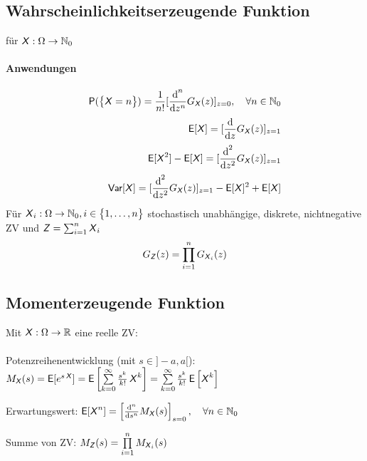 \documentclass[german,color,6pt]{latex4ei/latex4ei_sheet}
\begin{document}
\begin{sectionbox}
	\subsection{Wahrscheinlichkeitserzeugende Funktion} 
	für $\operatorname{\textsf{\textit{X}}} : \Omega \rightarrow \mathbb N_0$
	
	
	\paragraph{Anwendungen}
	\begin{eqnarray*}
		\P(\eset{\X = n}) = \frac{1}{n!} [\frac{\diff^n}{\diff z^n} G_{\X} (z)]_{z = 0}, \quad \forall n \in \mathbb N_0 \\
		\E [\X] = [\frac{\diff}{\diff z} G_{\X} (z)]_{z = 1} \\
		\E [\X^2]-\E[\X] = [\frac{\diff^2}{\diff z^2} G_{\X} (z)]_{z = 1} \\
		\Var [\X] =[\frac{\diff^2}{\diff z^2} G_{\X} (z)]_{z = 1} - \E [\X]^2 + \E [\X] 
	\end{eqnarray*}
	Für $\operatorname{\textsf{\textit{X}}}_i : \Omega \rightarrow \mathbb N_0, i \in \bigl\{1, \ldots, n\bigr\}$ stochastisch unabhängige, diskrete, nichtnegative ZV und $\operatorname{\textsf{\textit{Z}}} = \sum_{i=1}^{n} \operatorname{\textsf{\textit{X}}}_i$
	\[G_{\operatorname{\textsf{\textit{Z}}}} (z) = \prod_{i = 1}^{n} G_{\operatorname{\textsf{\textit{X}}}_i} (z)\]
	
\end{sectionbox}

\begin{sectionbox}
	\subsection{Momenterzeugende Funktion} %
	\label{sub:momenterzeugende_funktion}
	
	Mit $\operatorname{\textsf{\textit{X}}}: \Omega \rightarrow \mathbb R$ eine reelle ZV: \\
	
	\\ 
	
	
	Potenzreihenentwicklung (mit $s \in ]-a, a[$):\\
	$M_{\operatorname{\textsf{\textit{X}}}} (s) = \operatorname{\textsf{E}} [ e^{s \operatorname{\textsf{\textit{X}}}}] = \operatorname{\textsf{E}} \left[\sum \limits_{k=0}^{\infty} \frac{s^k}{k!} \operatorname{\textsf{\textit{X}}}^k\right] = \sum \limits_{k=0}^{\infty} \frac{s^k}{k!} \operatorname{\textsf{E}}\left[\operatorname{\textsf{\textit{X}}}^k\right]$
	
	Erwartungswert:
	$\E[\X^n] = \left[\frac{\diff^n}{\diff s^n} M_{\X} (s)\right]_{s=0}, \quad \forall n \in \mathbb N_0$
	
	Summe von ZV:
	$M_{\operatorname{\textsf{\textit{Z}}}} (s) = \prod \limits_{i = 1}^{n} M_{\operatorname{\textsf{\textit{X}}}_i} (s)$
\end{sectionbox}
\end{document}
